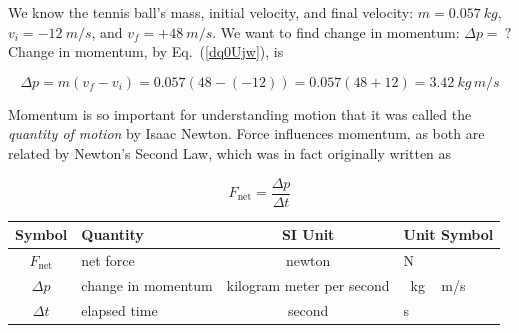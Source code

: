 \documentclass{article}
\numberwithin{equation}{section}
\numberwithin{figure}{section}
\begin{document}
\begin{center}
%
%
\end{center}

\Solution We know the tennis ball's mass, initial velocity, and final velocity: $m = \SI{0.057}{kg}$, $v_i = -\SI{12}{m/s}$, and $v_f = +\SI{48}{m/s}$. We want to find change in momentum: $\Delta p =\ ?$ Change in momentum, by Eq.~(\ref{dq0Ujw}), is

\begin{equation*}
    \Delta p  = m \left(v_f - v_i\right) = 0.057 \left(48 - \left(-12\right) \right) = 0.057 \left(48 + 12 \right) = \SI{3.42}{kg\,m/s}
\end{equation*}

\cyanhrule

Momentum is so important for understanding motion that it was called the \textit{quantity of motion} by Isaac Newton. Force influences momentum, as both are related by Newton's Second Law, which was in fact originally written as

\begin{equation} \label{e8sC6q}
    F_{\text{net}} = \frac{\Delta p}{\Delta t}
\end{equation}

\begin{center}
    \begin{tabular}{cl|cl}
    \hline
    \textbf{Symbol} & \textbf{Quantity} & \textbf{SI Unit} & \textbf{Unit Symbol}  \\
    \hline\hline
    \rule{0pt}{2.5ex}
        $F_{\text{net}}$ & net force & newton & N\\
        $\Delta p$ & change in momentum & kilogram meter per second & \SI{}{kg\,m/s}\\
        $\Delta t$ & elapsed time & second & s\\
    \hline
    \end{tabular}
\end{center}
\end{document}
